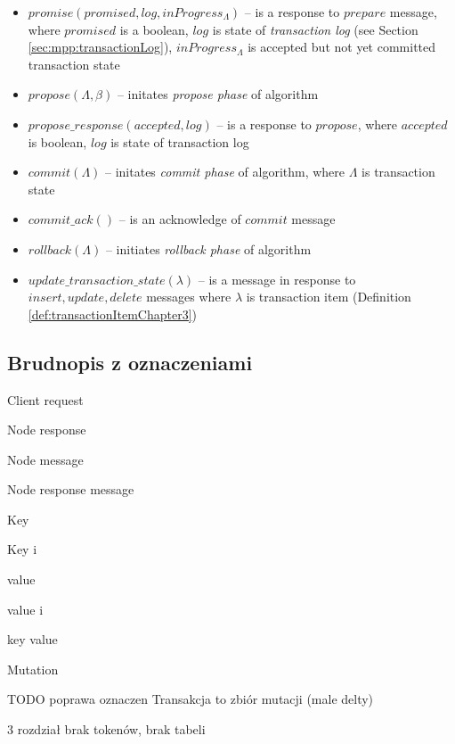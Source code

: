 \begin{definition}
\begin{itemize}
	\item $\mathit{promise(promised, log, inProgress_{\Lambda})}$ -- is a response to $\mathit{prepare}$ message, where $\mathit{promised}$ is a boolean, $\mathit{log}$ is state of \emph{transaction log} (see Section \ref{sec:mpp:transactionLog}), $\mathit{inProgress_{\Lambda}}$ is accepted but not yet committed transaction state 
	\item $\mathit{propose}(\Lambda, \beta)$ -- initates \emph{propose phase} of \mpt algorithm
	\item $\mathit{propose\_response}(accepted, log)$ -- is a response to $\mathit{propose}$, where $\mathit{accepted}$ is boolean, $\mathit{log}$ is state of transaction log 
	\item $\mathit{commit}(\Lambda)$ -- initates \emph{commit phase} of \mpt algorithm, where $\Lambda$ is transaction state 
	\item $\mathit{commit\_ack()}$ -- is an acknowledge of $\mathit{commit}$ message 
	\item $\mathit{rollback}(\Lambda)$ -- initiates \emph{rollback phase} of \mpt algorithm
	\item $\mathit{update\_transaction\_state}(\lambda)$ -- is a message in response to $\mathit{insert, update, delete}$ messages where $\lambda$ is transaction item (Definition \ref{def:transactionItemChapter3}) 
	\end{itemize}
\end{definition}

\subsection{Brudnopis z oznaczeniami}

Client request 

Node response 

Node message 

Node response message 

Key \key

Key i 

value \kvalue

value i 

key value \kv

Mutation 

TODO poprawa oznaczen
Transakcja to zbiór mutacji (male delty)

3 rozdział brak tokenów, brak tabeli

